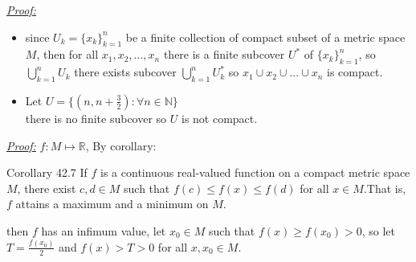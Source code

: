 \documentclass{amsbook}
\begin{document}
\begin{tcolorbox}[enhanced,attach boxed title to top center={yshift=-3mm,yshifttext=-1mm},
  colback=blue!5!white,colframe=blue!75!black,colbacktitle=red!80!black,
  title=Exercise 42.3:,fonttitle=\bfseries,
  boxed title style={size=small,colframe=red!50!black} ]
     \textit{\color{blue}\underline{Proof:}}
\begin{itemize}
    \item since $U_k=\{x_k\}_{k=1}^{n}$ be a finite collection of compact subset of a metric space $M$, then for
    all $x_1,x_2,...,x_n$ there is a finite 
    subcover $U^*$ of $\{x_k\}_{k=1}^{n}$, so $\bigcup_{k=1}^{n}U_k$ there exists subcover 
    $\bigcup_{k=1}^{n}U^*_k$ so $x_1 \cup x_2 \cup...\cup x_n$ is 
    compact.
    \item Let $U=\{(n,n+\frac{3}{2}):\forall n\in \mathbb{N}\}$\\
    there is no finite subcover so $U$ is not compact.
\end{itemize}     
\end{tcolorbox}



\begin{tcolorbox}[enhanced,attach boxed title to top center={yshift=-3mm,yshifttext=-1mm},
  colback=blue!5!white,colframe=blue!75!black,colbacktitle=red!80!black,
  title=Exercise 42.6:,fonttitle=\bfseries,
  boxed title style={size=small,colframe=red!50!black} ]
     \textit{\color{blue}\underline{Proof:}} $f:M\longmapsto\mathbb{R}$, By corollary:
     \begin{tcolorbox}[colback=red!5!white,colframe=red!75!black]
{\color{red}Corollary 42.7} If $f$ is a continuous real-valued function on a compact metric
space $M$, there exist $c,d\in M$ such that $f(c)\leq f(x)\leq f(d)$ for all $x\in M$.That is, $f$ attains a 
maximum and a minimum on $M$.  
 \end{tcolorbox}
 then $f$ has an infimum value, let $x_0\in M$ such that $f(x)\geq f(x_0)>0$, so let $T=\frac{f(x_0)}{2}$ and 
 $f(x)>T>0$ for all $x,x_0\in M$.
\end{tcolorbox}



\end{document}
